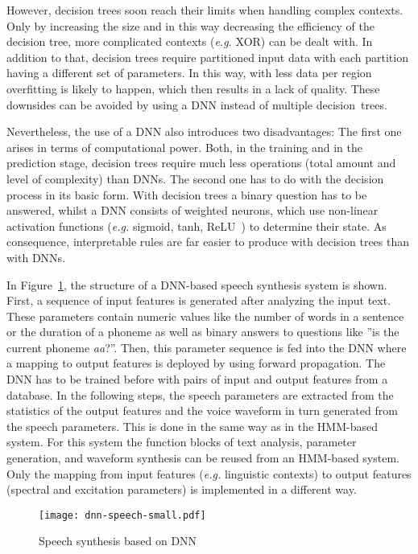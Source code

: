 However, decision trees soon reach their limits when handling complex contexts. Only by increasing the size and in this way decreasing the efficiency of the decision tree, more complicated contexts (\textit{e.g.} XOR) can be dealt with. In addition to that, decision trees require partitioned input data with each partition having a different set of parameters. In this way, with less data per region overfitting
is likely to happen, which then results in a lack of quality. These downsides can be avoided by using a \ac{DNN} instead of multiple decision~trees.

Nevertheless, the use of a \ac{DNN} also introduces two disadvantages: The first one arises in terms of computational power. Both, in the training and in the prediction stage, decision trees require much less operations (total amount and level of complexity) than \acp{DNN}. The second one has to do with the decision process in its basic form. With decision trees a binary question has to be answered, whilst a \ac{DNN} consists of weighted neurons, which use non-linear activation functions (\textit{e.g.} sigmoid, tanh, ReLU~\cite{chung:activation}) to determine their state. As consequence, interpretable rules are far easier to produce with decision trees than with \acp{DNN}.

In Figure~\ref{fig:dnnspeech}, the structure of a \ac{DNN}-based speech synthesis system is shown. First, a sequence of input features is generated after analyzing the input text. These parameters contain numeric values like the number of words in a sentence or the duration of a phoneme as well as binary answers to questions like ''is the current phoneme \textit{aa}?''. Then, this parameter sequence is fed into the \ac{DNN} where a mapping to output features is deployed by using forward propagation. The \ac{DNN} has to be trained before with pairs of input and output features from a database. In the following steps, the speech parameters are extracted from the statistics of the output features and the voice waveform in turn generated from the speech parameters. This is done in the same way as in the \ac{HMM}-based system. For this system the function blocks of text analysis, parameter generation, and waveform synthesis can be reused from an \ac{HMM}-based system. Only the mapping from input features (\textit{e.g.} linguistic contexts) to output features (spectral and excitation parameters) is implemented in a different way.

\begin{figure}[h]
	\texttt{[image: dnn-speech-small.pdf]}
	\caption{Speech synthesis based on \ac{DNN}~\cite{zen:deepstatistical}}
	\label{fig:dnnspeech}
\end{figure}

